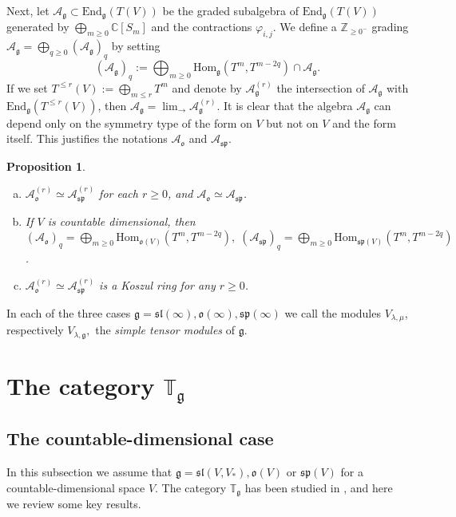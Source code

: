 \documentclass{svmult}
\newtheorem{prop}[theo]{Proposition}
\newcommand {\ZZ} {\mathbb {Z}}
\newcommand {\CC} {\mathbb {C}}
\newcommand{\TT}{\mathbb{T}}
\renewcommand{\sp}{\mathfrak{sp}}
\renewcommand{\sl}{\mathfrak{sl}}
\newcommand{\oo}{\mathfrak{o}}
\renewcommand{\gg}{\mathfrak{g}}
\newcommand{\End}{\mathrm{End}}
\begin{document}
Next, let $\mathcal A_\gg\subset \End_{\gg}(T(V))$ be the graded
subalgebra of $\End_{\gg}(T(V))$ generated by 
$\bigoplus_{m\geq 0}\CC[S_m]$ and the contractions
$\varphi_{i,j}$. We define a $\ZZ_{\geq 0^-}$ grading  $\mathcal
A_{\gg}=\bigoplus_{q\geq 0} (\mathcal A_{\gg})_q$ by setting 
$$(\mathcal A_{\gg})_q:=\bigoplus_{m\geq 0}{\mathrm{Hom}}_\gg(T^m,T^{m-2q})\cap\mathcal A_{\gg}.$$ 
If we set $T^{\leq r}(V):=\bigoplus_{m\leq r} T^m$ and denote by
$\mathcal A_{\gg}^{(r)}$ the intersection of  
$\mathcal A_{\gg}$ with $\End_{\gg}(T^{\leq r}(V))$, then 
$\mathcal A_{\gg}=\displaystyle\lim_{\rightarrow}\mathcal
A_{\gg}^{(r)}$. It is clear that the algebra 
$\mathcal A_\gg$ can depend only on the symmetry type of the form on
$V$ but not on $V$ and the form itself. 
This justifies the notations $\mathcal A_{\oo}$ and $ \mathcal A_{\sp}$.


\begin{prop}\label{Koszul3} \cite{DPS}
\begin{enumerate}[a)]
 \item $\mathcal A_{\oo}^{(r)}\simeq \mathcal A_{\sp}^{(r)}$ for each $r\geq 0$, and  $\mathcal A_{\oo}\simeq \mathcal A_{\sp}$.
  \item If $V$ is countable dimensional, then $(\mathcal A_{\oo})_q = \bigoplus_{m\geq 0}{\mathrm{Hom}}_{\oo(V)}(T^m, T^{m-2q}),\;(\mathcal A_{\sp})_q = \bigoplus_{m\geq 0}{\mathrm{Hom}}_{\sp(V)}(T^m, T^{m-2q})$.
  \item $\mathcal A_{\oo}^{(r)}\simeq \mathcal A_{\sp}^{(r)}$ is a Koszul ring for any $r\geq0$.
\end{enumerate}
\end{prop}

In each of the three cases $\gg = \sl(\infty), \oo(\infty), \sp(\infty)$ we call the 
modules $V_{\lambda,\mu}$, respectively $V_{\lambda,\gg},$ the \textit{simple tensor modules} of $\gg$.

\section{The category $\TT_{\gg}$}\label{sect:5}

\subsection{The countable-dimensional case}\label{sect:5.1} 
In this subsection we assume that $\gg=\sl(V,V_*),\oo(V)$ or $\sp(V)$ for a countable-dimensional space $V$. The category  $\TT_{\gg}$ has been studied in \cite{DPS}, and here we review some key results.
\end{document}
